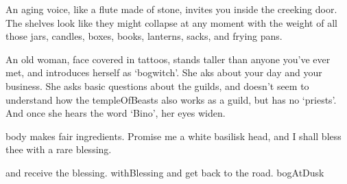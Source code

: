 An aging voice, like a flute made of stone, invites you inside the creeking door.
The shelves look like they might collapse at any moment with the weight of all those jars, candles, boxes, books, lanterns, sacks, and frying pans.

An old woman, face covered in tattoos, stands taller than anyone you've ever met, and introduces herself as `\gls{bogwitch}'.
She aks about your day and your business.
She asks basic questions about the guilds, and doesn't seem to understand how the \gls{templeOfBeasts} also works as a guild, but has no `priests'.
And once she hears the word `Bino', her eyes widen.

\begin{speechtext}
   body makes fair \glspl{ingredient}.
  Promise me a white \gls{basilisk} head, and I shall bless thee with a rare blessing.
\end{speechtext}

\begin{selectPath}
  {and receive the blessing.}%
  {withBlessing}
  {and get back to the road.}%
  {bogAtDusk}
\end{selectPath}
